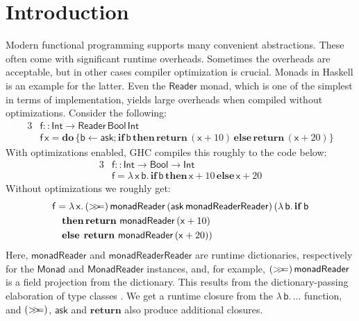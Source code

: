 \documentclass[acmsmall]{acmart}
\newcommand{\msf}[1]{{\mathsf{#1}}}
\newcommand{\mbf}[1]{{\mathbf{#1}}}
\newcommand{\mdo}{\mbf{do}\,}
\newcommand{\ind}{\hspace{1em}}
\newcommand{\bif}{\mbf{if}\,}
\newcommand{\bthen}{\mbf{then}\,}
\newcommand{\belse}{\mbf{else}\,}
\newcommand{\return}{\mbf{return}\,}
\newcommand{\lam}{\lambda\,}
\newcommand{\vb}{\mathsf{b}}
\newcommand{\vx}{\mathsf{x}}
\newcommand{\vf}{\mathsf{f}}
\newcommand{\Int}{\msf{Int}}
\newcommand{\Reader}{\msf{Reader}}
\newcommand{\Bool}{\msf{Bool}}
\newcommand{\fro}{\leftarrow}
\newcommand{\bind}{\mathbin{>\!\!>\mkern-6.7mu=}}
\theoremstyle{remark}
\begin{document}


\maketitle


\section{Introduction}\label{sec:introduction}

Modern functional programming supports many convenient abstractions. These often
come with significant runtime overheads. Sometimes the overheads are acceptable,
but in other cases compiler optimization is crucial. Monads in Haskell is an
example for the latter. Even the $\Reader$ monad, which is one of the simplest
in terms of implementation, yields large overheads when compiled without
optimizations. Consider the following:
\begin{alignat*}{3}
  &\vf :: \Int \to \Reader\,\Bool\,\Int \\
  &\vf\,\vx = \mdo\{\vb \fro \msf{ask}; \bif \vb\, \bthen \return (\vx + 10)\, \belse \return (\vx + 20)\}
\end{alignat*}
With optimizations enabled, GHC compiles this roughly to the code below:
\begin{alignat*}{3}
  &\vf :: \Int \to \Bool \to \Int \\
  &\vf = \lam \vx\,\vb.\, \bif \vb\, \bthen \vx + 10\, \belse \vx + 20
\end{alignat*}
Without optimizations we roughly get:
\begin{alignat*}{3}
  &\vf = \lam \vx.\,(\bind)\,\msf{monadReader}\,(\msf{ask}\,\msf{monadReaderReader})\,(\lam \vb.\,\bif \vb\\
  &\ind \bthen\return\,\msf{monadReader}\,(\vx + 10)\\
  &\ind \belse\hspace{0.25em}\return\,\msf{monadReader}\,(\vx + 20))
\end{alignat*}
Here, $\msf{monadReader}$ and $\msf{monadReaderReader}$ are runtime
dictionaries, respectively for the $\msf{Monad}$ and $\msf{MonadReader}$
instances, and, for example, $(\bind)\,\msf{monadReader}$ is a field projection
from the dictionary. This results from the dictionary-passing elaboration of
type classes \cite{DBLP:conf/popl/WadlerB89}. We get a runtime closure from the
$\lam \vb.\,...$ function, and $(\bind)$, $\msf{ask}$ and $\mbf{return}$ also
produce additional closures.
\end{document}
